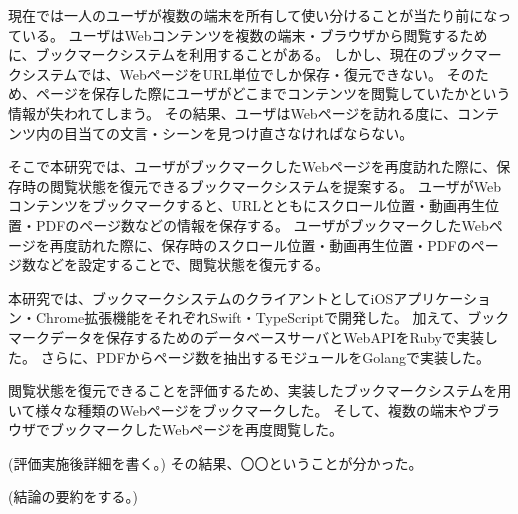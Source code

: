 \begin{jabstract}

  現在では一人のユーザが複数の端末を所有して使い分けることが当たり前になっている。
  ユーザはWebコンテンツを複数の端末・ブラウザから閲覧するために、ブックマークシステムを利用することがある。
  しかし、現在のブックマークシステムでは、WebページをURL単位でしか保存・復元できない。
  そのため、ページを保存した際にユーザがどこまでコンテンツを閲覧していたかという情報が失われてしまう。
  その結果、ユーザはWebページを訪れる度に、コンテンツ内の目当ての文言・シーンを見つけ直さなければならない。  

  そこで本研究では、ユーザがブックマークしたWebページを再度訪れた際に、保存時の閲覧状態を復元できるブックマークシステムを提案する。
  ユーザがWebコンテンツをブックマークすると、URLとともにスクロール位置・動画再生位置・PDFのページ数などの情報を保存する。
  ユーザがブックマークしたWebページを再度訪れた際に、保存時のスクロール位置・動画再生位置・PDFのページ数などを設定することで、閲覧状態を復元する。

  本研究では、ブックマークシステムのクライアントとしてiOSアプリケーション・Chrome拡張機能をそれぞれSwift・TypeScriptで開発した。
  加えて、ブックマークデータを保存するためのデータベースサーバとWebAPIをRubyで実装した。
  さらに、PDFからページ数を抽出するモジュールをGolangで実装した。

  閲覧状態を復元できることを評価するため、実装したブックマークシステムを用いて様々な種類のWebページをブックマークした。
  そして、複数の端末やブラウザでブックマークしたWebページを再度閲覧した。

  (評価実施後詳細を書く。)
  その結果、〇〇ということが分かった。

  (結論の要約をする。)

\end{jabstract}
